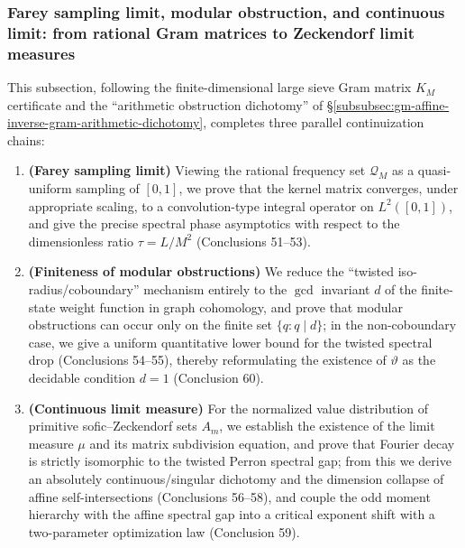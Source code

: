 \subsubsection{Farey sampling limit, modular obstruction, and continuous limit: from rational Gram matrices to Zeckendorf limit measures}\label{subsubsec:gm-farey-limit-mod-obstruction-zeck-measure}
This subsection, following the finite-dimensional large sieve Gram matrix \(K_M\) certificate and the ``arithmetic obstruction dichotomy'' of \S\ref{subsubsec:gm-affine-inverse-gram-arithmetic-dichotomy}, completes three parallel continuization chains:
\begin{enumerate}
  \item \textbf{(Farey sampling limit)} Viewing the rational frequency set \(\mathcal{Q}_M\) as a quasi-uniform sampling of \([0,1]\), we prove that the kernel matrix converges, under appropriate scaling, to a convolution-type integral operator on \(L^2([0,1])\), and give the precise spectral phase asymptotics with respect to the dimensionless ratio \(\tau=L/M^2\) (Conclusions 51--53).
  \item \textbf{(Finiteness of modular obstructions)} We reduce the ``twisted iso-radius/coboundary'' mechanism entirely to the \(\gcd\) invariant \(d\) of the finite-state weight function in graph cohomology, and prove that modular obstructions can occur only on the finite set \(\{q:q\mid d\}\); in the non-coboundary case, we give a uniform quantitative lower bound for the twisted spectral drop (Conclusions 54--55), thereby reformulating the existence of \(\vartheta\) as the decidable condition \(d=1\) (Conclusion 60).
  \item \textbf{(Continuous limit measure)} For the normalized value distribution of primitive sofic--Zeckendorf sets \(A_m\), we establish the existence of the limit measure \(\mu\) and its matrix subdivision equation, and prove that Fourier decay is strictly isomorphic to the twisted Perron spectral gap; from this we derive an absolutely continuous/singular dichotomy and the dimension collapse of affine self-intersections (Conclusions 56--58), and couple the odd moment hierarchy with the affine spectral gap into a critical exponent shift with a two-parameter optimization law (Conclusion 59).
\end{enumerate}

